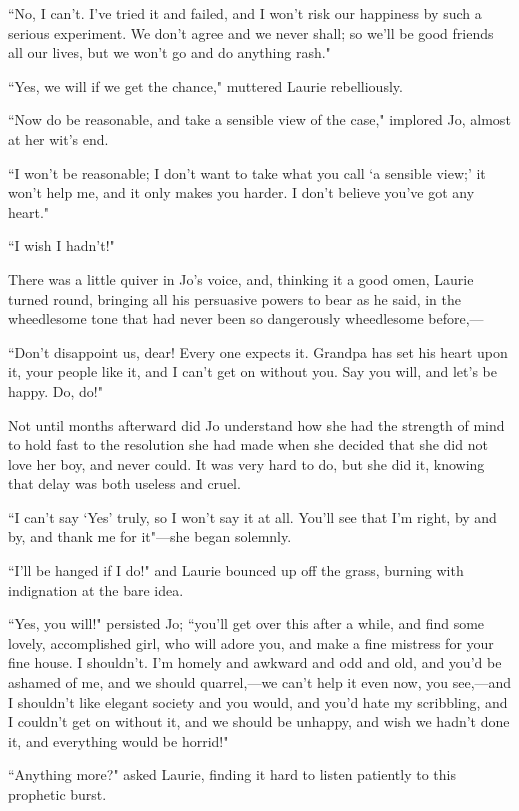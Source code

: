 ``No, I can't. I've tried it and failed,
and I won't risk our happiness by such a serious
experiment. We don't agree and we never shall; so
we'll be good friends all our lives, but we
won't go and do anything rash."

``Yes, we will if we get the chance," muttered Laurie rebelliously.

``Now do be reasonable, and take a sensible view of the case," implored
Jo, almost at her wit's end.

``I won't be reasonable; I don't want to
take what you call `a sensible view;'
it won't help me, and it only makes you harder. I
don't believe you've got any heart."

``I wish I hadn't!"

There was a little quiver in Jo's voice, and, thinking
it a good omen, Laurie turned round, bringing all his persuasive powers
to bear as he said, in the wheedlesome tone that had never been so
dangerously wheedlesome before,---

``Don't disappoint us, dear! Every one expects it.
Grandpa has set his heart upon it, your people like it, and I
can't get on without you. Say you will, and
let's be happy. Do, do!"

Not until months afterward did Jo understand how she had the strength of
mind to hold fast to the resolution she had made when she decided that
she did not love her boy, and never could. It was very hard to do, but
she did it, knowing that delay was both useless and cruel.

``I can't say `Yes'
truly, so I won't say it at all. You'll
see that I'm right, by and by, and thank me for
it"---she began solemnly.

``I'll be hanged if I do!" and Laurie bounced up off the
grass, burning with indignation at the bare idea.

``Yes, you will!" persisted Jo; ``you'll get over this
after a while, and find some lovely, accomplished girl, who will adore
you, and make a fine mistress for your fine house. I
shouldn't. I'm homely and awkward and
odd and old, and you'd be ashamed of me, and we should
quarrel,---we can't help it even now, you see,---and I
shouldn't like elegant society and you would, and
you'd hate my scribbling, and I couldn't
get on without it, and we should be unhappy, and wish we
hadn't done it, and everything would be horrid!"

``Anything more?" asked Laurie, finding it hard to listen patiently to
this prophetic burst.

